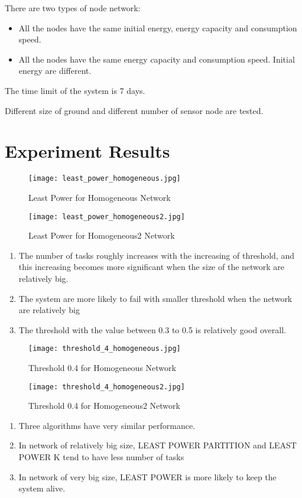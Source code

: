 \documentclass[11pt]{article}
\begin{document}
There are two types of node network:
\begin{itemize}
\item All the nodes have the same initial energy, energy capacity and consumption speed.
\item All the nodes have the same energy capacity and consumption speed. Initial energy are different.
\end{itemize}

The time limit of the system is 7 days.

Different size of ground and different number of sensor node are tested.
\section{Experiment Results}
\begin{figure}[ht!]
\centering
\texttt{[image: least\_power\_homogeneous.jpg]}
\caption{Least Power for Homogeneous Network}
\label{fig:least_power_homogeneous}
\end{figure}

\begin{figure}[ht!]
\centering
\texttt{[image: least\_power\_homogeneous2.jpg]}
\caption{Least Power for Homogeneous2 Network}
\label{fig:least_power_homogeneous2}
\end{figure}

\begin{enumerate}
\item The number of tasks roughly increases with the increasing of threshold, and this increasing becomes more significant when the size of the network are relatively big.
\item The system are more likely to fail with smaller threshold when the network are relatively big
\item The threshold with the value between 0.3 to 0.5 is relatively good overall.
\end{enumerate}

\begin{figure}[ht!]
\centering
\texttt{[image: threshold\_4\_homogeneous.jpg]}
\caption{Threshold 0.4 for Homogeneous Network}
\label{fig:threshold_4_homogeneous}
\end{figure}

\begin{figure}[ht!]
\centering
\texttt{[image: threshold\_4\_homogeneous2.jpg]}
\caption{Threshold 0.4 for Homogeneous2 Network}
\label{fig:threshold_4_homogeneous2}
\end{figure}

\begin{enumerate}
\item Three algorithms have very similar performance.
\item In network of relatively big size, LEAST POWER PARTITION and LEAST POWER K tend to have less number of tasks
\item In network of very big size, LEAST POWER is more likely to keep the system alive.

\end{enumerate}
\end{document}
